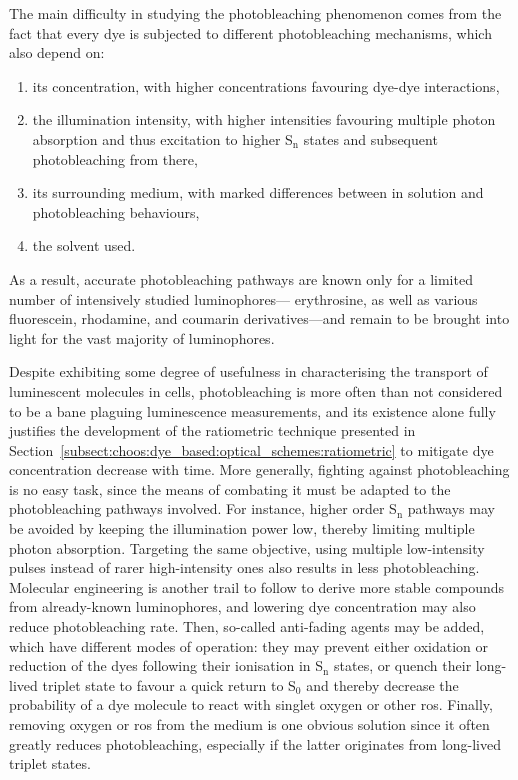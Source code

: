 The main difficulty in studying the photobleaching phenomenon comes from the fact that every dye is subjected to different photobleaching mechanisms, which also depend on:
\begin{enumerate}
	\item its concentration, with higher concentrations favouring dye-dye interactions\cite{song1997},
	\item the illumination intensity, with higher intensities favouring multiple photon absorption and thus excitation to higher S$_\text{n}$ states and subsequent photobleaching from there\cite{widengren1996},
	\item its surrounding medium, with marked differences between in solution and \invitro{} photobleaching behaviours\cite{widengren1996},
	\item the solvent used\cite{woodford2017}.
\end{enumerate}
As a result, accurate photobleaching pathways are known only for a limited number of intensively studied luminophores---\eg{} erythrosine, as well as various fluorescein, rhodamine, and coumarin derivatives\cite{zheng2017pbl, song1995, karlsson2017}---and remain to be brought into light for the vast majority of luminophores.

Despite exhibiting some degree of usefulness in characterising the transport of luminescent molecules in cells\cite{axelrod1976}, photobleaching is more often than not considered to be a bane plaguing luminescence measurements, and its existence alone fully justifies the development of the ratiometric technique presented in Section~\ref{subsect:choos:dye_based:optical_schemes:ratiometric} to mitigate dye concentration decrease with time. More generally, fighting against photobleaching is no easy task, since the means of combating it must be adapted to the photobleaching pathways involved. For instance, higher order S$_\text{n}$ pathways may be avoided by keeping the illumination power low, thereby limiting multiple photon absorption\cite{widengren1996, diaspro2006}. Targeting the same objective, using multiple low-intensity pulses instead of rarer high-intensity ones also results in less photobleaching\cite{donnert2007, ji2008}. Molecular engineering is another trail to follow to derive more stable compounds from already-known luminophores\cite{sun1997}, and lowering dye concentration may also reduce photobleaching rate\cite{song1997}. Then, so-called anti-fading agents may be added, which have different modes of operation: they may prevent either oxidation or reduction of the dyes following their ionisation in S$_\text{n}$ states, or quench their long-lived triplet state to favour a quick return to S$_0$ and thereby decrease the probability of a dye molecule to react with singlet oxygen or other \gls{ros}\cite{diaspro2006}. Finally, removing oxygen or \gls{ros} from the medium is one obvious solution since it often greatly reduces photobleaching, especially if the latter originates from long-lived triplet states\cite{song1995, widengren1996}.

